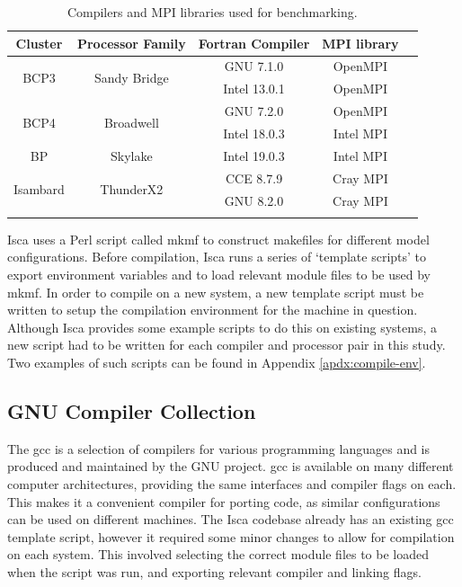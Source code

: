 \documentclass[a4paper,11pt]{report}
\begin{document}
\begin{table}[htp]
\caption{Compilers and MPI libraries used for benchmarking.}
\begin{center}
\begin{tabular}{c c c c c}
 \toprule

\textbf{Cluster} 			&	\textbf{Processor Family}		&	\textbf{Fortran Compiler}		&	\textbf{MPI library}	 \\
\midrule
\multirow{2}{*}{BCP3} 	&	\multirow{2}{*}{Sandy Bridge}	&	GNU 7.1.0 			&	OpenMPI	 \\
					& 							& 	Intel 13.0.1			&	OpenMPI			\\
\midrule	
\multirow{2}{*}{BCP4}	&	\multirow{2}{*}{Broadwell}		&	GNU 7.2.0			&	OpenMPI			\\
	&											&	Intel 18.0.3			&	Intel MPI			\\
\midrule	
BP					&	Skylake					&	Intel 19.0.3 			&	Intel MPI			\\
\midrule			
\multirow{2}{*}{Isambard}	&	\multirow{2}{*}{ThunderX2}	&	CCE 8.7.9				&	Cray MPI			\\
					&							&	GNU 8.2.0			&	Cray MPI			\\
\bottomrule \\
\end{tabular}	
\end{center}
\label{tbl:compilers}
\end{table}%
\par
Isca uses a Perl script called \gls{mkmf} to construct makefiles for different model configurations. Before compilation, Isca runs a series of `template scripts' to export environment variables and to load relevant module files to be used by \gls{mkmf}. In order to compile on a new system, a new template script must be written to setup the compilation environment for the machine in question. Although Isca provides some example scripts to do this on existing systems, a new script had to be written for each compiler and processor pair in this study. Two examples of such scripts can be found in Appendix \ref{apdx:compile-env}.  

\subsection{GNU Compiler Collection}
The \gls{gcc} is a selection of compilers for various programming languages and is produced and maintained by the GNU project. \gls{gcc} is available on many different computer architectures, providing the same interfaces and compiler flags on each. This makes it a convenient compiler for porting code, as similar configurations can be used on different machines. The Isca codebase already has an existing \gls{gcc} template script, however it required some minor changes to allow for compilation on each system. This involved selecting the correct module files to be loaded when the script was run, and exporting relevant compiler and linking flags.
\end{document}
